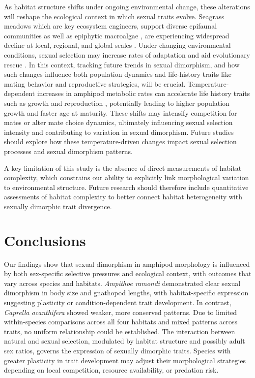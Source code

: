 \documentclass[journal,article,submit,pdftex,moreauthors]{Definitions/mdpi}
\begin{document}
    		As habitat structure shifts under ongoing environmental change, these alterations will reshape the ecological context in which sexual traits evolve. Seagrass meadows which are key ecosystem engineers, support diverse epifaunal communities as well as epiphytic macroalgae \citep{Tuya2014}, are experiencing widespread decline at local, regional, and global scales \citep{tuya2014decadal}. Under changing environmental conditions, sexual selection may increase rates of adaptation and aid evolutionary rescue \citep{martinossi2019efficacy}. In this context, tracking future trends in sexual dimorphism, and how such changes influence both population dynamics and life-history traits like mating behavior and reproductive strategies, will be crucial. Temperature-dependent increases in amphipod metabolic rates can accelerate life history traits such as growth and reproduction \citep{SainteMarie1991}, potentially leading to higher population growth and faster age at maturity. These shifts may intensify competition for mates or alter mate choice dynamics, ultimately influencing sexual selection intensity and contributing to variation in sexual dimorphism. Future studies should explore how these temperature-driven changes impact sexual selection processes and sexual dimorphism patterns.
    		
    		A key limitation of this study is the absence of direct measurements of habitat complexity, which constrains our ability to explicitly link morphological variation to environmental structure. Future research should therefore include quantitative assessments of habitat complexity to better connect habitat heterogeneity with sexually dimorphic trait divergence.
    		
\section{Conclusions}

		Our findings show that sexual dimorphism in amphipod morphology is influenced by both sex-specific selective pressures and ecological context, with outcomes that vary across species and habitats. \textit{Ampithoe ramondi} demonstrated clear sexual dimorphism in body size and gnathopod lengths, with habitat-specific expression suggesting plasticity or condition-dependent trait development. In contrast, \textit{Caprella acanthifera} showed weaker, more conserved patterns. Due to limited within-species comparisons across all four habitats and mixed patterns across traits, no uniform relationship could be established. The interaction between natural and sexual selection, modulated by habitat structure and possibly adult sex ratios, governs the expression of sexually dimorphic traits. Species with greater plasticity in trait development may adjust their morphological strategies depending on local competition, resource availability, or predation risk. 
    		
\end{document}
